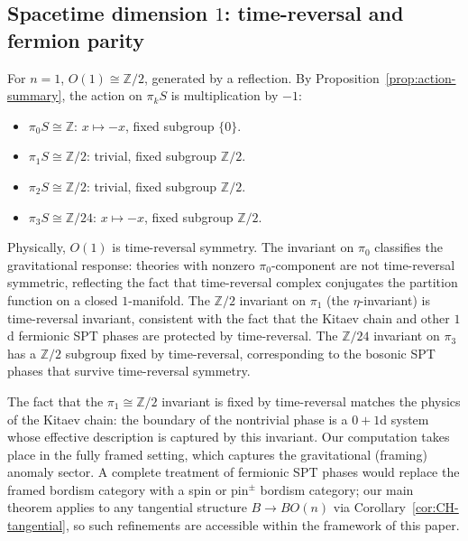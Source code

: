 \documentclass{amsart}
\begin{document}
\subsection{Spacetime dimension \texorpdfstring{$1$}{1}: time-reversal and fermion parity}



For $n=1$, $O(1)\cong \mathbb{Z}/2$, generated by a reflection. By Proposition~\ref{prop:action-summary}, the action on $\pi_k S$ is multiplication by $-1$:

\begin{itemize}
    \item[$\natural_1$] $\pi_0 S \cong \mathbb{Z}$: $x \mapsto-x$, fixed subgroup $\{0\}$.
    \item[$\natural_2$] $\pi_1 S \cong \mathbb{Z}/2$: trivial, fixed subgroup $\mathbb{Z}/2$.
    \item[$\natural_3$] $\pi_2 S \cong \mathbb{Z}/2$: trivial, fixed subgroup $\mathbb{Z}/2$.
    \item[$\natural_4$] $\pi_3 S \cong \mathbb{Z}/24$: $x \mapsto -x$, fixed subgroup $\mathbb{Z}/2$.
\end{itemize}


Physically, $O(1)$ is time-reversal symmetry. The invariant on $\pi_0$ classifies the gravitational response: theories with nonzero $\pi_0$-component are not time-reversal symmetric, reflecting the fact that time-reversal complex conjugates the partition function on a closed $1$-manifold. The $\mathbb{Z}/2$ invariant on $\pi_1$ (the $\eta$-invariant) is time-reversal invariant, consistent with the fact that the Kitaev chain and other $1$d fermionic SPT phases are protected by time-reversal. The $\mathbb{Z}/24$ invariant on $\pi_3$ has a $\mathbb{Z}/2$ subgroup fixed by time-reversal, corresponding to the bosonic SPT phases that survive time-reversal symmetry.


\begin{remark}
The fact that the $\pi_1 \cong \mathbb{Z}/2$ invariant is fixed by time-reversal matches the physics of the Kitaev chain: the boundary of the nontrivial phase is a $0+1$d system whose effective description is captured by this invariant. Our computation takes place in the fully framed setting, which captures the gravitational (framing) anomaly sector. A complete treatment of fermionic SPT phases would replace the framed bordism category with a spin or $\mathrm{pin}^\pm$ bordism category; our main theorem applies to any tangential structure $B \to BO(n)$ via Corollary~\ref{cor:CH-tangential}, so such refinements are accessible within the framework of this paper.
\end{remark}
\end{document}
